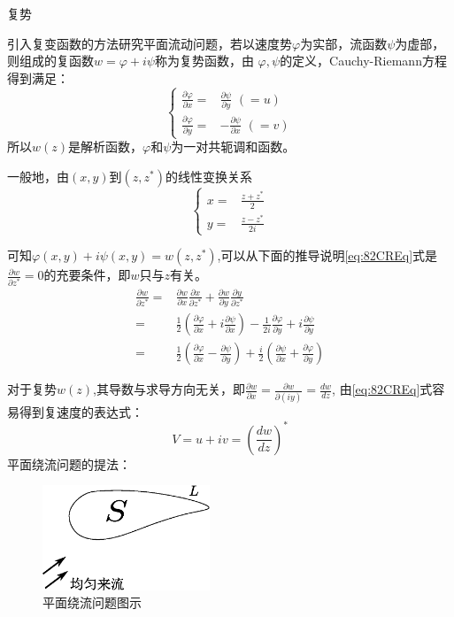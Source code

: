 复势

引入复变函数的方法研究平面流动问题，若以速度势$\varphi$为实部，流函数$\psi$为虚部，则组成的复函数$w=\varphi+i\psi$称为复势函数，由
$\varphi,\psi$的定义，Cauchy-Riemann方程得到满足：
\begin{equation}\label{eq:82CREq}
\begin{cases}
\frac{\partial \varphi}{\partial x}=& \frac{\partial \psi}{\partial y} \,\,(=u)\\
\frac{\partial \varphi}{\partial y}=& -\frac{\partial \psi}{\partial x}\,\, (=v)
\end{cases}
\end{equation}
所以$w(z)$是解析函数，$\varphi$和$\psi$为一对共轭调和函数。

一般地，由$(x,y)$到$(z,z^*)$的线性变换关系
\begin{equation}
\begin{cases}
x=&\frac{z+z^*}{2}\\
y=&\frac{z-z^*}{2i}
\end{cases}
\end{equation}

可知$\varphi(x,y)+i\psi(x,y)=w(z,z^*)$,可以从下面的推导说明\eqref{eq:82CREq}式是$\frac{\partial w}{\partial z^*}=0$的充要条件，即$w$只与$z$有关。
\begin{align*}
\frac{\partial w}{\partial z^*} = & \frac{\partial w}{\partial x}\frac{\partial x}{\partial z^*}
+\frac{\partial w}{\partial y}\frac{\partial y}{\partial z^*}\\
= & \frac{1}{2}(\frac{\partial \varphi}{\partial x}+i\frac{\partial \psi}{\partial x})
-\frac{1}{2i}\frac{\partial \varphi}{\partial y}+i\frac{\partial \psi}{\partial y}\\
= & \frac{1}{2}(\frac{\partial \varphi}{\partial x}-\frac{\partial \psi}{\partial y})
+\frac{i}{2}(\frac{\partial \psi}{\partial x}+\frac{\partial \varphi}{\partial y})
\end{align*}

对于复势$w(z)$,其导数与求导方向无关，即$\frac{\partial w}{\partial x}=\frac{\partial w}{\partial (iy)}=\frac{dw}{dz}$,
由\eqref{eq:82CREq}式容易得到复速度的表达式：
\begin{equation}\label{eq:82ComplexVelocity}
V=u+iv=\left(\frac{dw}{dz}\right)^*
\end{equation}
平面绕流问题的提法：
\begin{figure}[!ht]
 \centering
 \includegraphics[width=5cm]{streamingProblem.eps}
 \caption{平面绕流问题图示}\label{fig:82StP}
\end{figure}

